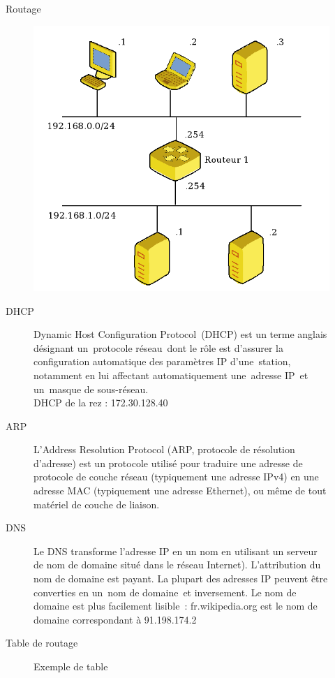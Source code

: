 \documentclass{beamer}
\begin{document}
	\begin{frame}{Routage}{}
		\begin{figure}
			\includegraphics[scale=0.4]{Network.png}
		\end{figure}
	\end{frame}
	

	\begin{frame}{DHCP}{}
		\begin{figure}
			Dynamic Host Configuration Protocol (DHCP) est un terme anglais désignant un protocole réseau dont le rôle est d’assurer la configuration automatique des paramètres IP d’une station, notamment en lui affectant automatiquement une adresse IP et un masque de sous-réseau.\\
			DHCP de la rez : 172.30.128.40
		\end{figure}
	\end{frame}

	\begin{frame}{ARP}{}
		\begin{figure}
			L’Address Resolution Protocol (ARP, protocole de résolution d’adresse) est un protocole utilisé pour traduire une adresse de protocole de couche réseau (typiquement une adresse IPv4) en une adresse MAC (typiquement une adresse Ethernet), ou même de tout matériel de couche de liaison.
		\end{figure}
	\end{frame}

	\begin{frame}{DNS}{}
		\begin{figure}
			Le DNS transforme l’adresse IP en un nom en utilisant un serveur de nom de domaine situé dans le réseau Internet). L’attribution du nom de domaine est payant. La plupart des adresses IP peuvent être converties en un nom de domaine et inversement. Le nom de domaine est plus facilement lisible : fr.wikipedia.org est le nom de domaine correspondant à 91.198.174.2
		\end{figure}
	\end{frame}
	
	\begin{frame}{Table de routage}{}
		\begin{figure}
			Exemple de table
		\end{figure}
	\end{frame}
\end{document}
